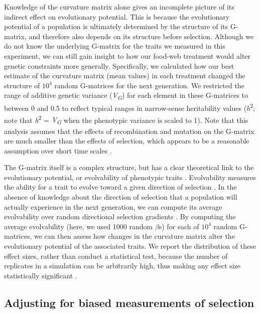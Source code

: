 \documentclass[11pt,]{article}
\begin{document}
Knowledge of the curvature matrix alone gives an incomplete picture of
its indirect effect on evolutionary potential. This is because the
evolutionary potential of a population is ultimately determined by the
structure of its G-matrix, and therefore also depends on its structure
before selection. Although we do not know the underlying G-matrix for
the traits we measured in this experiment, we can still gain insight to
how our food-web treatment would alter genetic constraints more
generally. Specifically, we calculated how our best estimate of the
curvature matrix (mean values) in each treatment changed the structure
of \ensuremath{10^{4}} random G-matrices for the next generation. We
restricted the range of additive genetic variance
(\emph{V\textsubscript{G}}) for each element in these G-matrices to
between 0 and 0.5 to reflect typical ranges in narrow-sense heritability
values (\emph{h}\textsuperscript{2}; note that
\emph{h}\textsuperscript{2} = \emph{V\textsubscript{G}} when the
phenotypic variance is scaled to 1). Note that this analysis assumes
that the effects of recombination and mutation on the G-matrix are much
smaller than the effects of selection, which appears to be a reasonable
assumption over short time scales \citep{Arnold2008}.

The G-matrix itself is a complex structure, but has a clear theoretical
link to the evolutionary potential, or evolvability of phenotypic traits
\citep{Hansen2008}. Evolvability measures the ability for a trait to
evolve toward a given direction of selection \citep{Hansen2008}. In the
absence of knowledge about the direction of selection that a population
will actually experience in the next generation, we can compute its
average evolvability over random directional selection gradients
\citep{Hansen2008, Melo2015}. By computing the average evolvability
(here, we used 1000 random \(\beta\)s) for each of \ensuremath{10^{4}}
random G-matrices, we can then assess how changes in the curvature
matrix alter the evolutionary potential of the associated traits. We
report the distribution of these effect sizes, rather than conduct a
statistical test, because the number of replicates in a simulation can
be arbitrarily high, thus making any effect size statistically
significant \citep{White2014}.

\subsection{Adjusting for biased measurements of
selection}\label{adjusting-for-biased-measurements-of-selection}
\end{document}
